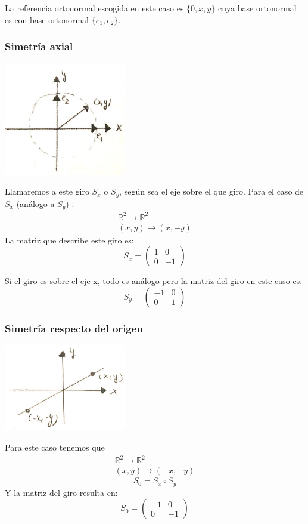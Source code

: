 \documentclass [a4paper,12pt]{article}
\begin{document}
La referencia ortonormal escogida en este caso es $\{0,x,y\}$ cuya base ortonormal es con base ortonormal $\{e_1,e_2\} $.

\subsubsection{Simetría axial}
\includegraphics[width=0.4\textwidth]
{imag1}\par\vspace{1cm}
Llamaremos a este giro $S_x$ o $S_y$, según sea el eje sobre el que giro. Para el caso de $S_x$ (análogo a $S_y$) :
\begin{equation}
\begin{split}
\mathbb{R}^2\rightarrow\mathbb{R}^2 \\
(x,y)\rightarrow(x,-y)
\end{split}
\end{equation}
La matriz que describe este giro es: 
$$
S_x=\begin{pmatrix}
1&0\\
0&-1
\end{pmatrix}
$$

Si el giro es sobre el eje x, todo es análogo pero la matriz del giro en este caso es:
$$
S_y=\begin{pmatrix}
-1&0\\
0&1
\end{pmatrix}
$$
\subsubsection{Simetría respecto del origen}
\includegraphics[width=0.4\textwidth]
{imag2}\par\vspace{1cm}
Para este caso tenemos que
\begin{equation}
\begin{split}
\mathbb{R}^2\rightarrow\mathbb{R}^2 \\
(x,y)\rightarrow(-x,-y)
\end{split}
\end{equation}
$$S_0=S_x  \circ S_y$$
Y la matriz del giro resulta en:
$$
S_0=\begin{pmatrix}
-1&0\\
0&-1
\end{pmatrix}
$$
\end{document}
